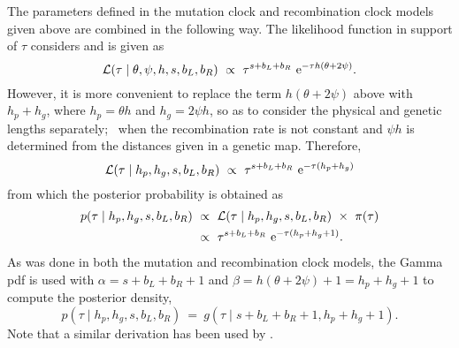 The parameters defined in the mutation clock and recombination clock models given above are combined in the following way.
The likelihood function in support of $\tau$ considers  and is given as
\begin{equation*}
	\mathcal{L}(\tau \mid \theta,\psi,h,s,b_L,b_R)~\propto~\tau^{s+b_L+b_R} \,\,\mathrm{e}^{-\tau h(\theta+2\psi)}\text{.}
\end{equation*}
However, it is more convenient to replace the term ${h(\theta+2\psi)}$ above with ${h_p + h_g}$, where $h_p=\theta h$ and ${h_g=2\psi h}$, so as to consider the physical and genetic lengths separately; \eg~when the recombination rate is not constant and ${\psi h}$ is determined from the distances given in a genetic map.
Therefore,
\begin{equation}\label{eq:com_like}
	\mathcal{L}(\tau \mid h_p,h_g,s,b_L,b_R)~\propto~\tau^{s+b_L+b_R} \,\,\mathrm{e}^{-\tau  (h_p + h_g)}
\end{equation}
from which the posterior probability is obtained as
\begin{equation}
	\begin{split}
		p(\tau \mid h_p,h_g,s,b_L,b_R)
		&~\propto~
		\mathcal{L}(\tau \mid h_p,h_g,s,b_L,b_R)~\times~\pi(\tau) \\
		&~\propto~
		\tau^{s + b_L + b_R} \,\,\mathrm{e}^{-\tau(h_p + h_g + 1)}\text{.}
	\end{split}
\end{equation}
As was done in both the mutation and recombination clock models, the Gamma \gls{pdf} is used with ${\alpha = s + b_L + b_R +1}$ and ${\beta = h(\theta + 2\psi) +1 = h_p + h_g + 1}$
to compute the posterior density, \ie
\begin{equation}
	p(\tau \mid h_p,h_g,s,b_L,b_R)~=~g(\tau\mid s + b_L + b_R +1, h_p + h_g + 1)\text{.}
\end{equation}
Note that a similar derivation has been used by \citet{schroff2016}.



